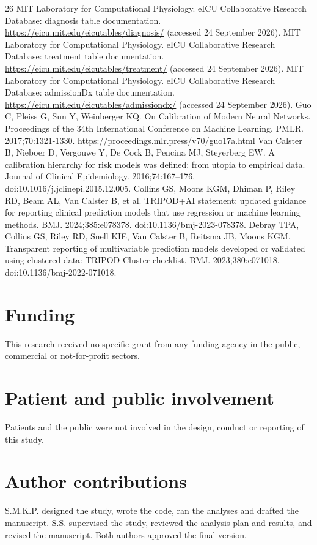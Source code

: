 \documentclass[11pt]{article}
\begin{document}
\begin{thebibliography}{26}
 MIT Laboratory for Computational Physiology. eICU Collaborative Research Database: diagnosis table documentation. \url{https://eicu.mit.edu/eicutables/diagnosis/} (accessed 24 September 2026).
 MIT Laboratory for Computational Physiology. eICU Collaborative Research Database: treatment table documentation. \url{https://eicu.mit.edu/eicutables/treatment/} (accessed 24 September 2026).
 MIT Laboratory for Computational Physiology. eICU Collaborative Research Database: admissionDx table documentation. \url{https://eicu.mit.edu/eicutables/admissiondx/} (accessed 24 September 2026).
 Guo C, Pleiss G, Sun Y, Weinberger KQ. On Calibration of Modern Neural Networks. Proceedings of the 34th International Conference on Machine Learning. PMLR. 2017;70:1321-1330. \url{https://proceedings.mlr.press/v70/guo17a.html}
 Van Calster B, Nieboer D, Vergouwe Y, De Cock B, Pencina MJ, Steyerberg EW. A calibration hierarchy for risk models was defined: from utopia to empirical data. Journal of Clinical Epidemiology. 2016;74:167--176. doi:10.1016/j.jclinepi.2015.12.005.
 Collins GS, Moons KGM, Dhiman P, Riley RD, Beam AL, Van Calster B, et al. TRIPOD+AI statement: updated guidance for reporting clinical prediction models that use regression or machine learning methods. BMJ. 2024;385:e078378. doi:10.1136/bmj-2023-078378.
 Debray TPA, Collins GS, Riley RD, Snell KIE, Van Calster B, Reitsma JB, Moons KGM. Transparent reporting of multivariable prediction models developed or validated using clustered data: TRIPOD-Cluster checklist. BMJ. 2023;380:e071018. doi:10.1136/bmj-2022-071018.
\end{thebibliography}

\section*{Funding}
This research received no specific grant from any funding agency in the public, commercial or not-for-profit sectors.

\section*{Patient and public involvement}
Patients and the public were not involved in the design, conduct or reporting of this study.

\section*{Author contributions}
S.M.K.P. designed the study, wrote the code, ran the analyses and drafted the manuscript. S.S. supervised the study, reviewed the analysis plan and results, and revised the manuscript. Both authors approved the final version.
\end{document}
